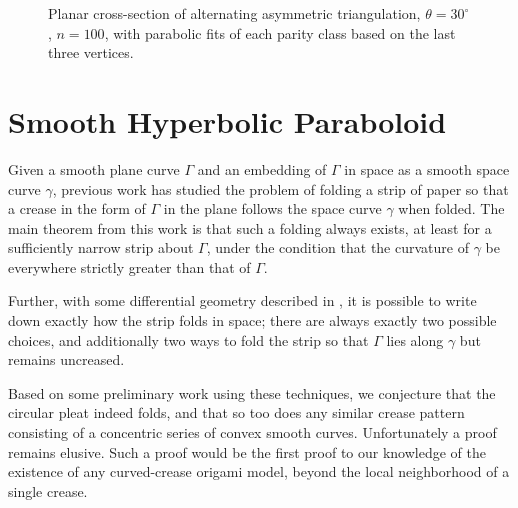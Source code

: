 \documentclass[11pt,letterpaper]{article}
\begin{document}
\begin{figure}
  \centering
  \begin{minipage}{1.9in}
  \end{minipage}\hfill
  \begin{minipage}{4in}
  \end{minipage}
  \caption{Planar cross-section of alternating asymmetric triangulation,
           $\theta = 30^\circ$, $n=100$, with parabolic fits of each parity
           class based on the last three vertices.}
  \label{zigzagall}
\end{figure}



\section{Smooth Hyperbolic Paraboloid}

Given a smooth plane curve $\Gamma$ and an embedding of $\Gamma$ in
space as a smooth space curve $\gamma$, previous work
\cite{FuchsTabachnikov} has studied the problem of folding a strip of
paper so that a crease in the form of $\Gamma$ in the plane follows
the space curve $\gamma$ when folded.  The main theorem from this work
is that such a folding always exists, at least for a sufficiently
narrow strip about $\Gamma$, under the condition that the curvature of
$\gamma$ be everywhere strictly greater than that of $\Gamma$.

Further, with some differential geometry described in
\cite{FuchsTabachnikov}, it is possible to write down exactly how the
strip folds in space; there are always exactly two possible choices,
and additionally two ways to fold the strip so that $\Gamma$ lies
along $\gamma$ but remains uncreased.

Based on some preliminary work using these techniques, we conjecture
that the circular pleat indeed folds, and that so too does any similar crease
pattern consisting of a concentric series of convex smooth curves.
Unfortunately a proof remains elusive.  Such a proof would be the first
proof to our knowledge of the existence of any curved-crease origami model,
beyond the local neighborhood of a single crease.
\end{document}
